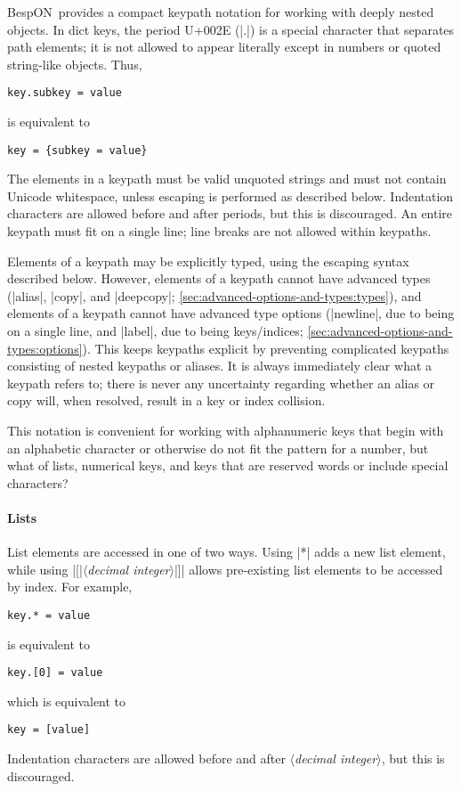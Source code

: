 \documentclass[11pt]{article}
\newcommand{\bespon}{BespON}
\newcommand{\vmeta}[1]{{\color{DarkRed}\ensuremath{\langle}\textit{#1}\ensuremath{\rangle}}}
\begin{document}
{{\bespon\ provides a compact keypath notation for working with deeply nested objects.  In dict keys, the period U+002E (|.|) is a special character that separates path elements; it is not allowed to appear literally except in numbers or quoted string-like objects.  Thus,
\begin{Verbatim}
key.subkey = value
\end{Verbatim}
is equivalent to
\begin{Verbatim}
key = {subkey = value}
\end{Verbatim}
The elements in a keypath must be valid unquoted strings and must not contain Unicode whitespace, unless escaping is performed as described below.  Indentation characters are allowed before and after periods, but this is discouraged.  An entire keypath must fit on a single line; line breaks are not allowed within keypaths.

Elements of a keypath may be explicitly typed, using the escaping syntax described below.  However, elements of a keypath cannot have advanced types (|alias|, |copy|, and |deepcopy|; \cref{sec:advanced-options-and-types:types}), and elements of a keypath cannot have advanced type options (|newline|, due to being on a single line, and |label|, due to being keys/indices; \cref{sec:advanced-options-and-types:options}).  This keeps keypaths explicit by preventing complicated keypaths consisting of nested keypaths or aliases.  It is always immediately clear what a keypath refers to; there is never any uncertainty regarding whether an alias or copy will, when resolved, result in a key or index collision.

This notation is convenient for working with alphanumeric keys that begin with an alphabetic character or otherwise do not fit the pattern for a number, but what of lists, numerical keys, and keys that are reserved words or include special characters?

\paragraph{Lists}

List elements are accessed in one of two ways.  Using |*| adds a new list element, while using |[|\vmeta{decimal integer}|]| allows pre-existing list elements to be accessed by index.  For example,
\begin{Verbatim}
key.* = value
\end{Verbatim}
is equivalent to
\begin{Verbatim}
key.[0] = value
\end{Verbatim}
which is equivalent to
\begin{Verbatim}
key = [value]
\end{Verbatim}
Indentation characters are allowed before and after \vmeta{decimal integer}, but this is discouraged.


}}
\end{document}
